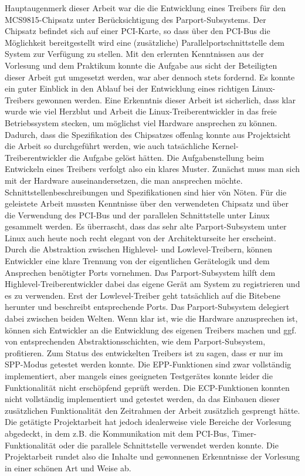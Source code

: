 \documentclass[a4paper,11pt]{article}
\begin{document}
Hauptaugenmerk dieser Arbeit war die die Entwicklung eines Treibers für den MCS9815-Chipsatz unter Berücksichtigung des Parport-Subsystems. Der Chipsatz befindet sich auf einer PCI-Karte, so dass über den PCI-Bus die Möglichkeit bereitgestellt wird eine (zusätzliche) Parallelportschnittstelle dem System zur Verfügung zu stellen. Mit den erlernten Kenntnissen aus der Vorlesung und dem Praktikum konnte die Aufgabe aus sicht der Beteiligten dieser Arbeit gut umgesetzt werden, war aber dennoch stets fordernd. Es konnte ein guter Einblick in den Ablauf bei der Entwicklung eines richtigen Linux-Treibers gewonnen werden. Eine Erkenntnis dieser Arbeit ist sicherlich, dass klar wurde wie viel Herzblut und Arbeit die Linux-Treiberentwickler in das freie Betriebssystem stecken, um möglichst viel Hardware ansprechen zu können. Dadurch, dass die Spezifikation des Chipsatzes offenlag konnte aus Projektsicht die Arbeit so durchgeführt werden, wie auch tatsächliche Kernel-Treiberentwickler die Aufgabe gelöst hätten. Die Aufgabenstellung beim Entwickeln eines Treibers verfolgt also ein klares Muster. Zunächst muss man sich mit der Hardware auseinandersetzen, die man ansprechen möchte. Schnittstellenbeschreibungen und Spezifikationen sind hier vön Nöten. Für die geleistete Arbeit mussten Kenntnisse über den verwendeten Chipsatz und über die Verwendung des PCI-Bus und der parallelen Schnittstelle unter Linux gesammelt werden. Es überrascht, dass das sehr alte Parport-Subsystem unter Linux auch heute noch recht elegant von der Architekturseite her erscheint. Durch die Abstraktion zwischen Highlevel- und Lowlevel-Treibern, können Entwickler eine klare Trennung von der eigentlichen Gerätelogik und dem Ansprechen benötigter Ports vornehmen. Das Parport-Subsystem hilft dem Highlevel-Treiberentwickler dabei das eigene Gerät am System zu registrieren und es zu verwenden. Erst der Lowlevel-Treiber geht tatsächlich auf die Bitebene herunter und beschreibt entsprechende Ports. Das Parport-Subsystem delegiert dabei zwischen beiden Welten. Wenn klar ist, wie die Hardware anzusprechen ist, können sich Entwickler an die Entwicklung des eigenen Treibers machen und ggf. von entsprechenden Abstraktionsschichten, wie dem Parport-Subsystem, profitieren. Zum Status des entwickelten Treibers ist zu sagen, dass er nur im SPP-Modus getestet werden konnte. Die EPP-Funktionen sind zwar vollständig implementiert, aber mangels eines geeigneten Testgerätes konnte leider die Funktionalität nicht erschöpfend geprüft werden. Die ECP-Funktionen konnten nicht vollständig implementiert und getestet werden, da das Einbauen dieser zusätzlichen Funktionalität den Zeitrahmen der Arbeit zusätzlich gesprengt hätte. Die getätigte Projektarbeit hat jedoch idealerweise viele Bereiche der Vorlesung abgedeckt, in dem z.B. die Kommunikation mit dem PCI-Bus, Timer-Funktionalität oder die parallele Schnittstelle verwendet werden konnte. Die Projektarbeit rundet also die Inhalte und gewonnenen Erkenntnisse der Vorlesung in einer schönen Art und Weise ab. 


\newpage
\cleardoublepage
\nocite{*}

\end{document}
